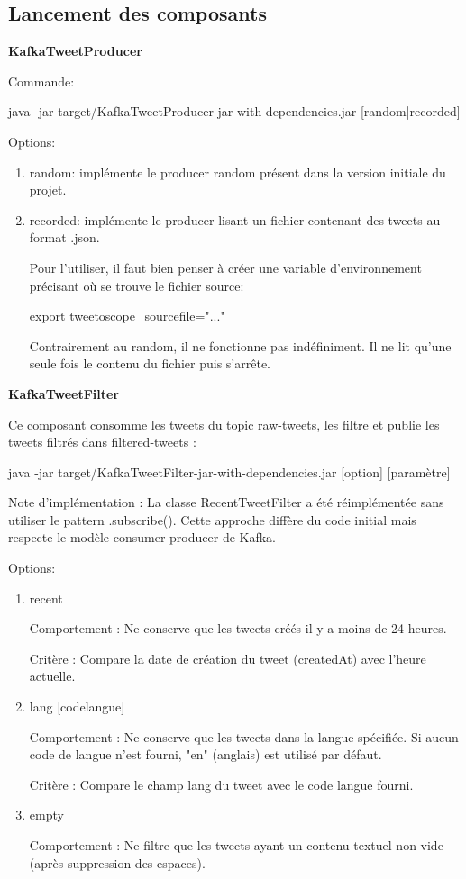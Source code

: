 \documentclass[10pt,a4paper]{article}
\begin{document}
\subsection{Lancement des composants}

\textbf{KafkaTweetProducer}

Commande:

java -jar target/KafkaTweetProducer-jar-with-dependencies.jar [random|recorded]

Options:

\begin{enumerate}
\item random: implémente le producer random présent dans la version initiale du projet. 

\item recorded: implémente le producer lisant un fichier contenant des tweets au format .json.

Pour l'utiliser, il faut bien penser à créer une variable d'environnement précisant où se trouve le fichier source:

export tweetoscope\_sourcefile="..."

Contrairement au random, il ne fonctionne pas indéfiniment. Il ne lit qu'une seule fois le contenu du fichier puis s'arrête. 
 
\end{enumerate}

\textbf{KafkaTweetFilter}

Ce composant consomme les tweets du topic raw-tweets, les filtre et publie les tweets filtrés dans filtered-tweets :

java -jar target/KafkaTweetFilter-jar-with-dependencies.jar [option] [paramètre]

Note d'implémentation : La classe RecentTweetFilter a été réimplémentée sans utiliser le pattern .subscribe(). Cette approche diffère du code initial mais respecte le modèle consumer-producer de Kafka.

Options:

\begin{enumerate}
\item recent 

Comportement : Ne conserve que les tweets créés il y a moins de 24 heures.

Critère : Compare la date de création du tweet (createdAt) avec l'heure actuelle.

\item lang [codelangue] 

Comportement : Ne conserve que les tweets dans la langue spécifiée. Si aucun code de langue n'est fourni, "en" (anglais) est utilisé par défaut.

Critère : Compare le champ lang du tweet avec le code langue fourni.

\item empty

Comportement : Ne filtre que les tweets ayant un contenu textuel non vide (après suppression des espaces).

\end{enumerate}
\end{document}
